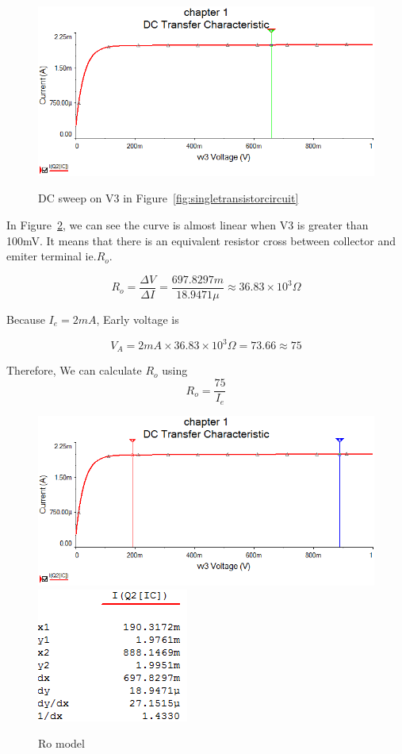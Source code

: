 \begin{figure}[htbp]
	\centering
	\includegraphics[scale=0.6]{"../Photo/Chap1/DC sweep on Batterty"}\\[0.5cm]
	\caption{DC sweep on V3 in Figure~\ref{fig:singletransistorcircuit} }
	\label{fig: DC sweep curve}
\end{figure}

In Figure~\ref{fig: Ro model}, we can see the curve is almost linear when V3 is greater than 100mV. It means that there is an equivalent resistor cross between collector and emiter terminal ie.$R_o$.

\[ R_o= \frac{\Delta V}{\Delta I}= \frac{697.8297m}{18.9471\mu} \approx 36.83\times10^3  \Omega \] 

Because $I_e = 2mA $, Early voltage is

\[ V_A = 2mA \times 36.83\times10^3 \Omega=  73.66 \approx 75 \]

Therefore, We can calculate $R_o$ using 
\begin{equation}
	R_o = \frac{75}{I_e} 
\end{equation}


\begin{figure}[htbp]
	\centering
	\includegraphics[scale=0.6]{"../Photo/Chap1/Ro model"}\\[0.5cm]
	\includegraphics[scale=0.8]{"../Photo/Chap1/Ro model data"}
	\caption{Ro model }
	\label{fig: Ro model}
\end{figure}




